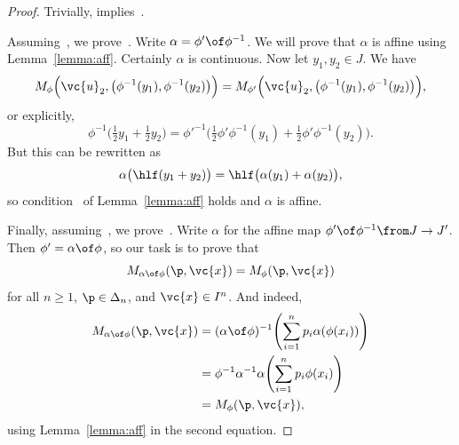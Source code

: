 \begin{proof}
Trivially,  implies~.  

Assuming~, we prove~.  Write
$\alpha = \phi' \of \phi^{-1}$.  We will prove that $\alpha$ is affine
using Lemma~\ref{lemma:aff}.  Certainly $\alpha$ is
continuous.  Now let $y_1, y_2 \in J$.  We have
\[
M_\phi\Bigl(
\vc{u}_2, \bigl(\phi^{-1}(y_1), \phi^{-1}(y_2)\bigr)
\Bigr)
=
M_{\phi'}\Bigl(
\vc{u}_2, \bigl(\phi^{-1}(y_1), \phi^{-1}(y_2)\bigr)
\Bigr),
\]
or explicitly,
\[
\phi^{-1} \bigl(
\tfrac{1}{2} y_1 + \tfrac{1}{2} y_2
\bigr)
=
{\phi'}^{-1} \bigl(
\tfrac{1}{2} \phi'\phi^{-1}(y_1) + \tfrac{1}{2} \phi'\phi^{-1} (y_2)
\bigr).
\]
But this can be rewritten as
\[
\alpha\bigl(
\hlf(y_1 + y_2)
\bigr)
=
\hlf
\bigl( \alpha(y_1) + \alpha(y_2) \bigr),
\]
so condition~ of Lemma~\ref{lemma:aff} holds and
$\alpha$ is affine.

Finally, assuming~, we prove~.
Write $\alpha$ for the affine map $\phi' \of \phi^{-1} \from J \to J'$.
Then $\phi' = \alpha \of \phi$, so our task is to prove that
\[
M_{\alpha\of\phi}(\p, \vc{x})
=
M_\phi(\p, \vc{x})
\]
for all $n \geq 1$, $\p \in \Delta_n$, and $\vc{x} \in I^n$.  And indeed,
% 
\begin{align*}
M_{\alpha\of\phi}(\p, \vc{x})   &
=
(\alpha \of \phi)^{-1} \Biggl(
\sum_{i = 1}^n p_i \alpha(\phi(x_i))
\Biggr) \\
&
=
\phi^{-1} \alpha^{-1} \alpha \Biggl(
\sum_{i = 1}^n p_i \phi(x_i)  
\Biggr) \\
&
=
M_\phi(\p, \vc{x}),
\end{align*}
% 
using Lemma~\ref{lemma:aff} in the second equation.
\end{proof}

